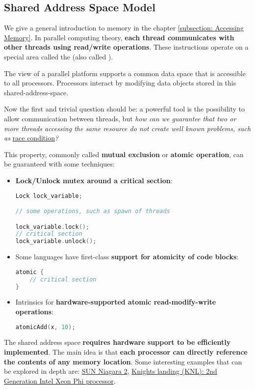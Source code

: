 \subsection{Shared Address Space Model}

We give a general introduction to memory in the chapter \ref{subsection: Accessing Memory}. In parallel computing theory, \textbf{each thread communicates with other threads using read/write operations}. These instructions operate on a special area called the  (also called ).

\highspace
\begin{definitionbox}
    The  view of a parallel platform supports a common data space that is accessible to all processors. Processors interact by modifying data objects stored in this shared-address-space.\cite{kumar1994introduction}
\end{definitionbox}

\highspace
Now the first and trivial question should be: a powerful tool is the possibility to allow communication between threads, but \emph{how can we guarantee that two or more threads accessing the same resource do not create well known problems, such as} \href{https://en.wikipedia.org/wiki/Race_condition#Data_race}{race condition}\emph{?}

This property, commonly called \textbf{mutual exclusion} or \textbf{atomic operation}, can be guaranteed with some techniques:
\begin{itemize}
    \item \textbf{Lock/Unlock mutex around a critical section}:
    \begin{lstlisting}[language=c++]
Lock lock_variable;

// some operations, such as spawn of threads

lock_variable.lock();
// critical section
lock_variable.unlock();\end{lstlisting}
    
    \item Some languages have first-class \textbf{support for atomicity of code blocks}:
    \begin{lstlisting}[language=c++]
atomic {
    // critical section
}\end{lstlisting}

    \item Intrinsics for \textbf{hardware-supported atomic read-modify-write operations}:
    \begin{lstlisting}[language=c++]
atomicAdd(x, 10);\end{lstlisting}
\end{itemize}
The shared address space \textbf{requires hardware support to be efficiently implemented}. The main idea is that \textbf{each processor can directly reference the contents of any memory location}. Some interesting examples that can be explored in depth are: \href{https://www.cs.rice.edu/~johnmc/comp522/lecture-notes/COMP522-2019-Lecture3-Multithreading.pdf}{SUN Niagara 2}, \href{https://ieeexplore.ieee.org/document/7477467}{Knights landing (KNL): 2nd Generation Intel Xeon Phi processor}.